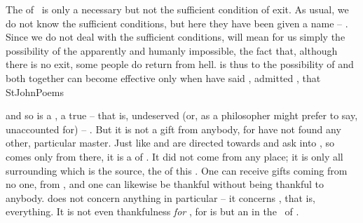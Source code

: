 \label{pre:thankful}%
The  of \yes\ is only a necessary but not the sufficient condition of
exit. As usual, we do not know the sufficient conditions, but here they have
been given a name -- . Since we do not deal with the sufficient conditions,
 will mean for us simply the possibility of the apparently and
humanly impossible, the fact that, although there is no  exit, some
people do return from hell.   is thus  to the possibility
of  and both together can become effective only when  have said
\Yes, admitted , that \citet{I live yet do not live
  in me.}{StJohnPoems}{}


 and so  is a , a true -- that is,
undeserved (or, as a philosopher might prefer to say, unaccounted for) -- .
But it is not a gift from anybody, for  have not found any other,
particular master. Just like  and  are directed towards and
ask into , so  comes only from there, it is a
 of . It did not come from any  place; it is
only all surrounding  which is the source, the  of
this .  One can receive gifts coming from no one, from ,
and one can likewise be thankful without being thankful to anybody.
 does not concern anything in particular -- it
concerns , that is, everything.  It is not even thankfulness {\em
  for} , for  is but an  in the \nexus\ of
.

\newp


